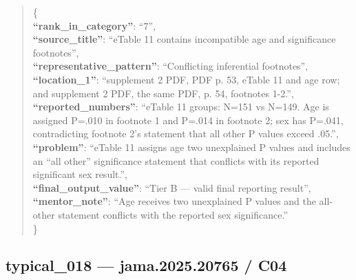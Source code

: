 \documentclass[
  letterpaper,
  9pt]{extreport}
\begin{document}
\begin{quote}
\{\\
\textbf{``rank\_in\_category''}: ``7'',\\
\textbf{``source\_title''}: ``eTable 11 contains incompatible age and
significance footnotes'',\\
\textbf{``representative\_pattern''}: ``Conflicting inferential
footnotes'',\\
\textbf{``location\_1''}: ``supplement 2 PDF, PDF p. 53, eTable 11 and
age row; and supplement 2 PDF, the same PDF, p. 54, footnotes 1-2.'',\\
\textbf{``reported\_numbers''}: ``eTable 11 groups: N=151 vs N=149. Age
is assigned P=.010 in footnote 1 and P=.014 in footnote 2; sex has
P=.041, contradicting footnote 2's statement that all other P values
exceed .05.'',\\
\textbf{``problem''}: ``eTable 11 assigns age two unexplained P values
and includes an ``all other'' significance statement that conflicts with
its reported significant sex result.'',\\
\textbf{``final\_output\_value''}: ``Tier B --- valid final reporting
result'',\\
\textbf{``mentor\_note''}: ``Age receives two unexplained P values and
the all-other statement conflicts with the reported sex
significance.''\\
\}
\end{quote}

\hypertarget{typical_018--jama202520765--c04}{%
\subsection{typical\_018 --- jama.2025.20765 /
C04}\label{typical_018--jama202520765--c04}}
\end{document}
